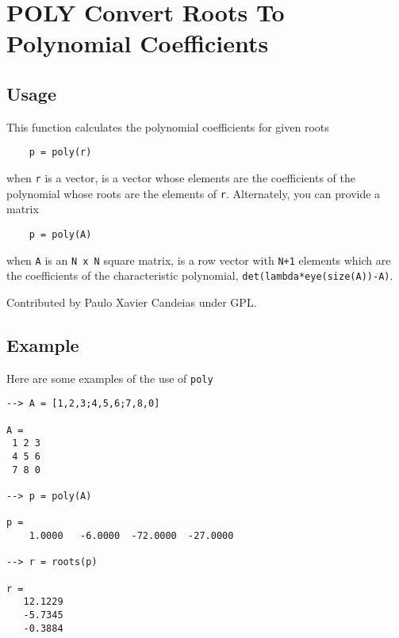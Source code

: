 \section{POLY Convert Roots To Polynomial Coefficients}

\subsection{Usage}

This function calculates the polynomial coefficients for given roots
\begin{verbatim}
    p = poly(r)
\end{verbatim}
when \verb|r| is a vector, is a vector whose elements are the coefficients 
of the polynomial whose roots are the elements of \verb|r|.  Alternately,
you can provide a matrix
\begin{verbatim}
    p = poly(A)
\end{verbatim}
when \verb|A| is an \verb|N x N| square matrix, is a row vector with 
\verb|N+1| elements which are the coefficients of the
characteristic polynomial, \verb|det(lambda*eye(size(A))-A)|.

Contributed by Paulo Xavier Candeias under GPL.
\subsection{Example}

Here are some examples of the use of \verb|poly|
\begin{verbatim}
--> A = [1,2,3;4,5,6;7,8,0]

A = 
 1 2 3 
 4 5 6 
 7 8 0 

--> p = poly(A)

p = 
    1.0000   -6.0000  -72.0000  -27.0000 

--> r = roots(p)

r = 
   12.1229 
   -5.7345 
   -0.3884 
\end{verbatim}

